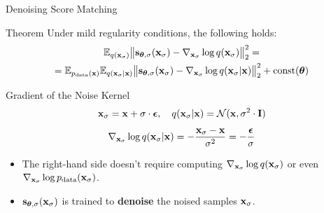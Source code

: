 \documentclass{beamer}
\begin{document}
\begin{frame}{Denoising Score Matching}
	\begin{block}{Theorem}
		Under mild regularity conditions, the following holds:
		\vspace{-0.3cm}
		\begin{multline*}
			\mathbb{E}_{q(\mathbf{x}_{\sigma})}\big\| \mathbf{s}_{\boldsymbol{\theta}, \sigma}(\mathbf{x}_{\sigma}) - \nabla_{\mathbf{x}_{\sigma}} \log q(\mathbf{x}_{\sigma}) \big\|^2_2 = \\
		= \mathbb{E}_{p_{\text{data}}(\mathbf{x})} \mathbb{E}_{q(\mathbf{x}_{\sigma} | \mathbf{x})}\big\| \mathbf{s}_{\boldsymbol{\theta}, \sigma}(\mathbf{x}_{\sigma}) - \nabla_{\mathbf{x}_{\sigma}} \log q(\mathbf{x}_{\sigma} | \mathbf{x}) \big\|^2_2 + \text{const}(\boldsymbol{\theta})
		\end{multline*}
		\vspace{-0.5cm}
	\end{block}
	\eqpause
	\begin{block}{Gradient of the Noise Kernel}
		\vspace{-0.3cm}
		\[
			\mathbf{x}_{\sigma} = \mathbf{x} + \sigma \cdot \boldsymbol{\epsilon}, \quad q(\mathbf{x}_{\sigma} | \mathbf{x}) = \mathcal{N}(\mathbf{x}, \sigma^2 \cdot \mathbf{I})
		\]
		\eqpause
		\vspace{-0.3cm}
		\[
			\nabla_{\mathbf{x}_{\sigma}} \log q(\mathbf{x}_{\sigma} | \mathbf{x}) = - \frac{\mathbf{x}_{\sigma} - \mathbf{x}}{\sigma^2}  = - \frac{\boldsymbol{\epsilon}}{\sigma}
		\]
		\eqpause
		\vspace{-0.5cm}
	\end{block}
	\begin{itemize}
		\item The right-hand side doesn't require computing $\nabla_{\mathbf{x}_{\sigma}} \log q(\mathbf{x}_{\sigma})$ or even $\nabla_{\mathbf{x}_{\sigma}} \log p_{\text{data}}(\mathbf{x}_{\sigma})$.
		\item $\mathbf{s}_{\boldsymbol{\theta}, \sigma}(\mathbf{x}_{\sigma})$ is trained to \textbf{denoise} the noised samples $\mathbf{x}_{\sigma}$.
	\end{itemize}
\end{frame}
\end{document}
